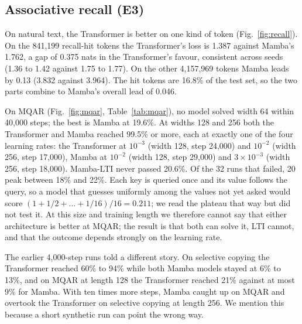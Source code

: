 \documentclass[conference]{IEEEtran}
\begin{document}
\subsection{Associative recall (E3)}
\label{sec:recall}
On natural text, the Transformer is better on one kind of token (Fig.~\ref{fig:recall}). On the 841,199
recall-hit tokens the
Transformer's loss is 1.387 against Mamba's 1.762, a gap of 0.375 nats in the Transformer's favour,
consistent across seeds (1.36 to 1.42 against 1.75 to 1.77). On the other 4,157,969 tokens Mamba leads
by 0.13 (3.832 against 3.964). The hit tokens are 16.8\% of the test set, so the two parts combine to
Mamba's overall lead of 0.046.

On MQAR (Fig.~\ref{fig:mqar}, Table~\ref{tab:mqar}), no model solved width 64 within 40,000 steps; the
best is Mamba at 19.6\%. At widths 128 and 256 both the Transformer and Mamba reached 99.5\% or more,
each at exactly one of the four learning rates: the Transformer at $10^{-3}$ (width 128, step 24,000)
and $10^{-2}$ (width 256, step 17,000), Mamba at $10^{-2}$ (width 128, step 29,000) and
$3\times10^{-3}$ (width 256, step 18,000). Mamba-LTI never passed 20.6\%. Of the 32 runs that failed, 20 peak between 18\% and
22\%. Each key is queried once and its value follows the query, so a model that guesses
uniformly among the values not yet asked would score $(1 + 1/2 + \dots + 1/16)/16 = 0.211$; we read the
plateau that way but did not test it. At this size and training length we therefore cannot say that
either architecture is better at MQAR; the result is that both can solve it, LTI cannot, and that the
outcome depends strongly on the learning rate.

The earlier 4,000-step runs told a different story. On selective copying the Transformer reached
60\% to 94\% while both Mamba models stayed at 6\% to 13\%, and on MQAR at length 128 the Transformer
reached 21\% against at most 9\% for Mamba. With ten times more steps, Mamba caught up on MQAR and
overtook the Transformer on selective copying at length 256. We mention this because a short synthetic
run can point the wrong way.
\end{document}
